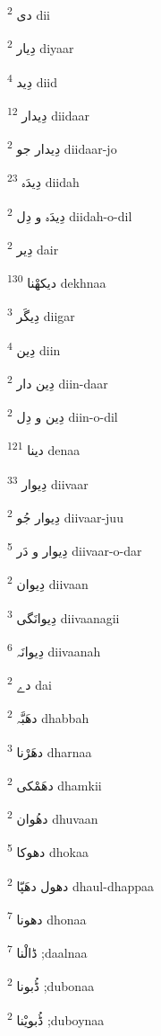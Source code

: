 \documentclass[12pt]{article}
\begin{document}
\begin{RTL}
\begin{multicols}{5}
{\ur دی}   \textsuperscript{2} dii

{\ur دِیار}   \textsuperscript{2} diyaar

{\ur دِید}   \textsuperscript{4} diid

{\ur دِیدار}   \textsuperscript{12} diidaar

{\ur دِیدار جو}   \textsuperscript{2} diidaar-jo

{\ur دِیدَہ}   \textsuperscript{23} diidah

{\ur دِیدَہ و دِل}   \textsuperscript{2} diidah-o-dil

{\ur دِیر}   \textsuperscript{2} dair

{\ur دیکھْنا}   \textsuperscript{130} dekhnaa

{\ur دِیگَر}   \textsuperscript{3} diigar

{\ur دِین}   \textsuperscript{4} diin

{\ur دِین دار}   \textsuperscript{2} diin-daar

{\ur دِین و دِل}   \textsuperscript{2} diin-o-dil

{\ur دینا}   \textsuperscript{121} denaa

{\ur دِیوار}   \textsuperscript{33} diivaar

{\ur دِیوار جُو}   \textsuperscript{2} diivaar-juu

{\ur دِیوار و دَر}   \textsuperscript{5} diivaar-o-dar

{\ur دِیوان}   \textsuperscript{2} diivaan

{\ur دِیوانَگی}   \textsuperscript{3} diivaanagii

{\ur دِیوانَہ}   \textsuperscript{6} diivaanah

{\ur دے}   \textsuperscript{2} dai

{\ur دھَبَّہ}   \textsuperscript{2} dhabbah

{\ur دھَرْنا}   \textsuperscript{3} dharnaa

{\ur دھَمْکی}   \textsuperscript{2} dhamkii

{\ur دھُوان}   \textsuperscript{2} dhuvaan

{\ur دھوکا}   \textsuperscript{5} dhokaa

{\ur دھول دھَپّا}   \textsuperscript{2} dhaul-dhappaa

{\ur دھونا}   \textsuperscript{7} dhonaa

{\ur ڈالْنا}   \textsuperscript{7} ;daalnaa

{\ur ڈُبونا}   \textsuperscript{2} ;dubonaa

{\ur ڈُبویْنا}   \textsuperscript{2} ;duboynaa


\end{multicols}
\end{RTL}
\end{document}
